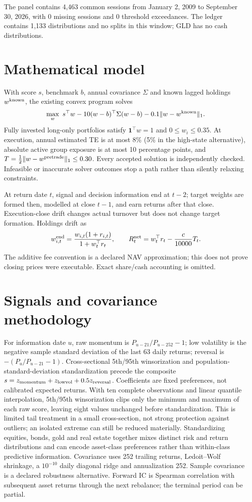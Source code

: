 \documentclass[11pt,a4paper]{article}
\begin{document}
The panel contains 4,463 common sessions from January 2, 2009 to September 30, 2026, with 0 missing sessions and 0 threshold exceedances. The ledger contains 1,133 distributions and no splits in this window; GLD has no cash distributions.


\section{Mathematical model}
With score $s$, benchmark $b$, annual covariance $\Sigma$ and known lagged
holdings $w^{\rm known}$, the existing convex program solves
\[
\max_w\ s^\top w-10(w-b)^\top\Sigma(w-b)
       -0.1\lVert w-w^{\rm known}\rVert_1.
\]
Fully invested long-only portfolios satisfy $\mathbf{1}^\top w=1$ and
$0\leq w_i\leq0.35$. At execution, annual estimated TE is at most 8\%
(5\% in the high-state alternative), absolute active group exposure is at most
10 percentage points, and $T=\tfrac12\lVert w-w^{\rm pretrade}\rVert_1\leq0.30$.
Every accepted solution is independently checked. Infeasible or inaccurate
solver outcomes stop a path rather than silently relaxing constraints.

At return date $t$, signal and decision information end at $t-2$; target weights
are formed then, modelled at close $t-1$, and earn returns after that close.
Execution-close drift changes actual turnover but does not change target
formation. Holdings drift as
\[
w_{i,t}^{\rm end}=\frac{w_{i,t}(1+r_{i,t})}{1+w_t^\top r_t},\qquad
R_t^{\rm net}=w_t^\top r_t-\frac{c}{10000}T_t.
\]
The additive fee convention is a declared NAV approximation; this does not
prove closing prices were executable. Exact share/cash accounting is omitted.
\section{Signals and covariance methodology}
For information date $u$, raw momentum is $P_{u-21}/P_{u-252}-1$;
low volatility is the negative sample standard deviation of the last 63 daily
returns; reversal is $-(P_u/P_{u-21}-1)$. Cross-sectional 5th/95th winsorization
and population-standard-deviation standardization precede the composite
$s=z_{\rm momentum}+z_{\rm lowvol}+0.5z_{\rm reversal}$.
Coefficients are fixed preferences, not calibrated expected returns.
With ten complete observations and linear quantile interpolation, 5th/95th
winsorization clips only the minimum and maximum of each raw score, leaving eight
values unchanged before standardization. This is limited tail treatment in a
small cross-section, not strong protection against outliers; an isolated extreme
can still be reduced materially. Standardizing equities, bonds, gold and real
estate together mixes distinct risk and return distributions and can encode
asset-class preferences rather than within-class predictive information.
Covariance uses 252 trailing returns, Ledoit--Wolf shrinkage, a $10^{-10}$
daily diagonal ridge and annualization 252. Sample covariance is a declared
robustness alternative. Forward IC is Spearman correlation with subsequent
asset returns through the next rebalance; the terminal period can be partial.
\end{document}
